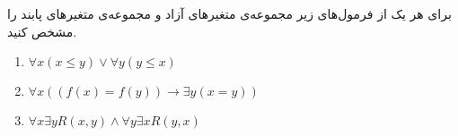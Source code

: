 برای هر یک از فرمول‌های زیر مجموعه‌ی متغیرهای آزاد و مجموعه‌ی متغیرهای پابند را مشخص کنید.
\begin{enumerate}[label=(\alph*)]
  \item $\forall x (x \leq y) \vee \forall y (y \leq x)$
  \item $\forall x ((f(x) = f(y)) \rightarrow \exists y (x = y))$
  \item $\forall x \exists y R(x, y) \wedge \forall y \exists x R(y, x)$
\end{enumerate}